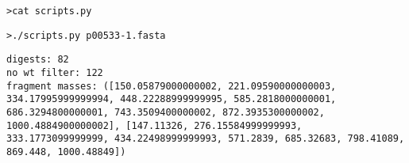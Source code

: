\documentclass[11pt, a4paper]{article}
\begin{document}
\texttt{>cat scripts.py}

\vspace{4em}

\texttt{>./scripts.py p00533-1.fasta}
\begin{lstlisting}
digests: 82
no wt filter: 122
fragment masses: ([150.05879000000002, 221.09590000000003, 334.17995999999994, 448.22288999999995, 585.2818000000001, 686.3294800000001, 743.3509400000002, 872.3935300000002, 1000.4884900000002], [147.11326, 276.15584999999993, 333.1773099999999, 434.22498999999993, 571.2839, 685.32683, 798.41089, 869.448, 1000.48849])

\end{lstlisting}
\end{document}
